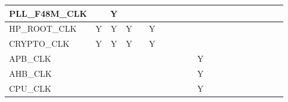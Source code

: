 \documentclass[main\_\_EN.tex]{subfiles}
\begin{document}
\begin{landscape}
\begin{tiny}
\begin{longtable}[c]{|m{2cm}|c|c|c|c|c|c|c|c|c|C{1.5cm}|c|c|c|c|c|c|c|c|c| }
    PLL\_F48M\_CLK &   & Y &   &  &   &   &   &   &  &   &   &   &   &   &   &   &   &  &  \\ \hline
    HP\_ROOT\_CLK & Y & Y & Y &  & Y &   &   &   &  &   &   &   &   &   &   &   &   &  &  \\ \hline
    CRYPTO\_CLK & Y & Y & Y &  & Y &   &   &   &  &   &   &   &   &   &   &   &   &  &  \\ \hline
    APB\_CLK &   &   &   &  &   &   &   &   &  & Y &   &   &   &   &   &   &   &  &  \\ \hline
    AHB\_CLK &   &   &   &  &   &   &   &   &  & Y &   &   &   &   &   &   &   &  &  \\ \hline
    CPU\_CLK &   &   &   &  &   &   &   &   &  & Y &   &   &   &   &   &   &   &  &  \\ \hline
\end{longtable}

\begin{longtable}[c]{|m{2.1cm}|c|c|c|c|c|c|c|c|c|C{1.4cm}|c|c|c|c|c|c|c|c|c| }


\end{longtable}
\end{tiny}
\end{landscape}
\end{document}
